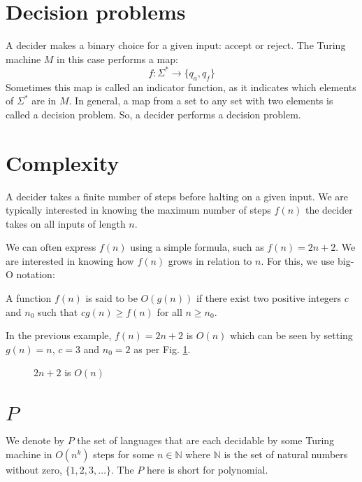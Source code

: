 \section{Decision problems}
  A decider makes a binary choice for a given input: accept or reject.
  The Turing machine \( M \) in this case performs a map:
  \[ f:\Sigma^* \rightarrow \{ q_a, q_f \} \]
  Sometimes this map is called an indicator function, as it indicates which elements of \( \Sigma^* \) are in \( M \).
  In general, a map from a set to any set with two elements is called a decision problem.
  So, a decider performs a decision problem.

\section{Complexity}
  A decider takes a finite number of steps before halting on a given input.
  We are typically interested in knowing the maximum number of steps \( f(n) \) the decider takes on all inputs of length \( n \).
  
  We can often express \( f(n) \) using a simple formula, such as \( f(n) = 2n + 2 \).
  We are interested in knowing how \( f(n) \) grows in relation to \( n \).
  For this, we use big-O notation:
  \begin{definition}
    A function \( f(n) \) is said to be \( O(g(n)) \) if there exist two positive integers \( c \) and \( n_0 \) such that \( cg(n) \geq f(n) \) for all \(n \geq n_0 \).
  \end{definition}
  In the previous example, \( f(n) = 2n + 2 \) is \( O(n) \) which can be seen by setting \( g(n) = n \), \( c = 3 \) and \( n_0 = 2 \) as per Fig. \ref{plot:2n2}.
  \begin{figure}[H]
  \caption{\( 2n + 2 \) is \( O(n) \)}
  \label{plot:2n2}
  \end{figure}

\section{\( P \)}
  We denote by \( P \) the set of languages that are each decidable by some Turing machine in \( O(n^k) \) steps for some \( n \in \mathbb{N} \) where \( \mathbb{N} \) is the set of natural numbers without zero, \( \{ 1, 2, 3, \ldots\} \).
  The \( P \) here is short for polynomial.

